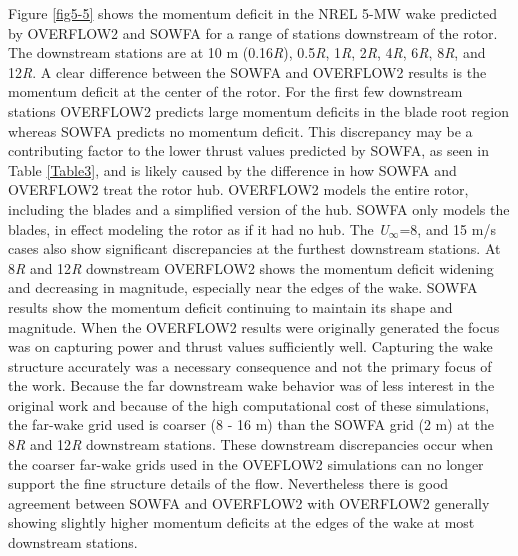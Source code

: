Figure \ref{fig5-5} shows the momentum deficit in the NREL 5-MW wake predicted by OVERFLOW2 and SOWFA for a range of stations downstream of the rotor. The downstream stations are at 10 m (0.16\emph{R}), 0.5\emph{R}, 1\emph{R}, 2\emph{R}, 4\emph{R}, 6\emph{R}, 8\emph{R}, and 12\emph{R}. A clear difference between the SOWFA and OVERFLOW2 results is the momentum deficit at the center of the rotor. For the first few downstream stations OVERFLOW2 predicts large momentum deficits in the blade root region whereas SOWFA predicts no momentum deficit. This discrepancy may be a contributing factor to the lower thrust values predicted by SOWFA, as seen in Table \ref{Table3}, and is likely caused by the difference in how SOWFA and OVERFLOW2 treat the rotor hub. OVERFLOW2 models the entire rotor, including the blades and a simplified version of the hub. SOWFA only models the blades, in effect modeling the rotor as if it had no hub. The \emph{U$_\infty$}=8, and 15 m/s cases also show significant discrepancies at the furthest downstream stations. At 8\emph{R} and 12\emph{R} downstream OVERFLOW2 shows the momentum deficit widening and decreasing in magnitude, especially near the edges of the wake. SOWFA results show the momentum deficit continuing to maintain its shape and magnitude. When the OVERFLOW2 results were originally generated the focus was on capturing power and thrust values sufficiently well.\cite{chow2012} Capturing the wake structure accurately was a necessary consequence and not the primary focus of the work. Because the far downstream wake behavior was of less interest in the original work and because of the high computational cost of these simulations, the far-wake grid used is coarser (8 - 16 m) than the SOWFA grid (2 m) at the 8\emph{R} and 12\emph{R} downstream stations. These downstream discrepancies occur when the coarser far-wake grids used in the OVEFLOW2 simulations can no longer support the fine structure details of the flow. Nevertheless there is good agreement between SOWFA and OVERFLOW2  with OVERFLOW2 generally showing slightly higher momentum deficits at the edges of the wake at most downstream stations. 

